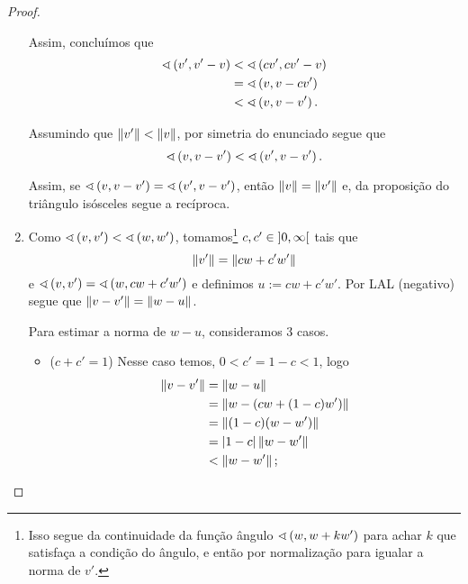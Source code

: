 \begin{proof}
\begin{enumerate}
	Assim, concluímos que
		\begin{align*}
		\sphericalangle\left({v'},{v'-v}\right) &< \sphericalangle\left({cv'},{cv'-v}\right) \\
			&= \sphericalangle\left({v},{v-cv'}\right) \\
			&< \sphericalangle\left({v},{v-v'}\right).
		\end{align*}

	Assumindo que $\left\Vert{v'}\right\Vert < \left\Vert{v}\right\Vert$, por simetria do enunciado segue que
		\begin{equation*}
	\sphericalangle\left({v},{v-v'}\right) < \sphericalangle\left({v'},{v-v'}\right).
	\end{equation*}

	Assim, se $\sphericalangle\left({v},{v-v'}\right) = \sphericalangle\left({v'},{v-v'}\right)$, então $\left\Vert{v}\right\Vert=\left\Vert{v'}\right\Vert$ e, da proposição do triângulo isósceles segue a recíproca.

	\item Como $\sphericalangle\left({v},{v'}\right) < \sphericalangle\left({w},{w'}\right)$, tomamos\footnote{Isso segue da continuidade da função ângulo $\sphericalangle\left({w},{w+kw'}\right)$ para achar $k$ que satisfaça a condição do ângulo, e então por normalização para igualar a norma de $v'$.} $c,c' \in \left]{0},{\infty}\right[$ tais que
		\begin{equation*}
		\left\Vert{v'}\right\Vert = \left\Vert{cw+c'w'}\right\Vert
		\end{equation*}
e $\sphericalangle\left({v},{v'}\right) = \sphericalangle\left({w},{cw+c'w'}\right)$ e definimos $u := cw+c'w'$. Por LAL (negativo) segue que $\left\Vert{v-v'}\right\Vert = \left\Vert{w-u}\right\Vert$.

	Para estimar a norma de $w-u$, consideramos $3$ casos.
		\begin{itemize}
		\item ($c+c' = 1$) Nesse caso temos, $0 < c' = 1-c < 1$, logo
			\begin{align*}
			\left\Vert{v-v'}\right\Vert &= \left\Vert{w-u}\right\Vert \\
				&= \left\Vert{w-(cw+(1-c)w')}\right\Vert \\
				&= \left\Vert{(1-c)(w-w')}\right\Vert \\
				&= \left\vert{1-c}\right\vert\left\Vert{w-w'}\right\Vert \\
				&< \left\Vert{w-w'}\right\Vert;
			\end{align*}


\end{itemize}
\end{enumerate}
\end{proof}

